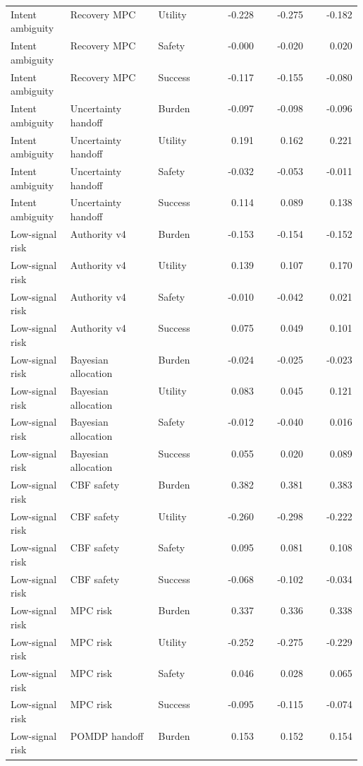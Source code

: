 \documentclass{article}
\begin{document}
\begin{center}
\begin{longtable}{p{0.17\linewidth}p{0.25\linewidth}p{0.16\linewidth}rrr}
Intent ambiguity & Recovery MPC & Utility & -0.228 & -0.275 & -0.182\\
Intent ambiguity & Recovery MPC & Safety & -0.000 & -0.020 & 0.020\\
Intent ambiguity & Recovery MPC & Success & -0.117 & -0.155 & -0.080\\
Intent ambiguity & Uncertainty handoff & Burden & -0.097 & -0.098 & -0.096\\
Intent ambiguity & Uncertainty handoff & Utility & 0.191 & 0.162 & 0.221\\
Intent ambiguity & Uncertainty handoff & Safety & -0.032 & -0.053 & -0.011\\
Intent ambiguity & Uncertainty handoff & Success & 0.114 & 0.089 & 0.138\\
Low-signal risk & Authority v4 & Burden & -0.153 & -0.154 & -0.152\\
Low-signal risk & Authority v4 & Utility & 0.139 & 0.107 & 0.170\\
Low-signal risk & Authority v4 & Safety & -0.010 & -0.042 & 0.021\\
Low-signal risk & Authority v4 & Success & 0.075 & 0.049 & 0.101\\
Low-signal risk & Bayesian allocation & Burden & -0.024 & -0.025 & -0.023\\
Low-signal risk & Bayesian allocation & Utility & 0.083 & 0.045 & 0.121\\
Low-signal risk & Bayesian allocation & Safety & -0.012 & -0.040 & 0.016\\
Low-signal risk & Bayesian allocation & Success & 0.055 & 0.020 & 0.089\\
Low-signal risk & CBF safety & Burden & 0.382 & 0.381 & 0.383\\
Low-signal risk & CBF safety & Utility & -0.260 & -0.298 & -0.222\\
Low-signal risk & CBF safety & Safety & 0.095 & 0.081 & 0.108\\
Low-signal risk & CBF safety & Success & -0.068 & -0.102 & -0.034\\
Low-signal risk & MPC risk & Burden & 0.337 & 0.336 & 0.338\\
Low-signal risk & MPC risk & Utility & -0.252 & -0.275 & -0.229\\
Low-signal risk & MPC risk & Safety & 0.046 & 0.028 & 0.065\\
Low-signal risk & MPC risk & Success & -0.095 & -0.115 & -0.074\\
Low-signal risk & POMDP handoff & Burden & 0.153 & 0.152 & 0.154\\

\end{longtable}
\end{center}
\end{document}
